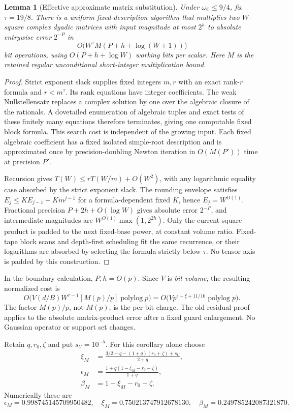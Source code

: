 \documentclass[11pt]{article}
\newtheorem{lemma}[theorem]{Lemma}
\newcommand{\plog}{\operatorname{polylog}}
\begin{document}
\begin{lemma}[Effective approximate matrix substitution]
Under $\omega_{\mathbb C}\leq9/4$, fix $\tau=19/8$. There is a uniform fixed-description algorithm that multiplies two $W$-square complex dyadic matrices with input magnitude at most $2^h$ to absolute entrywise error $2^{-P}$ in
\[
 O\bigl(W^\tau M(P+h+\log(W+1))\bigr)
\]
bit operations, using $O(P+h+\log W)$ working bits per scalar. Here $M$ is the retained regular unconditional short-integer multiplication bound.
\end{lemma}
\begin{proof}
Strict exponent slack supplies fixed integers $m,r$ with an exact rank-$r$ formula and $r<m^\tau$. Its rank equations have integer coefficients. The weak Nullstellensatz replaces a complex solution by one over the algebraic closure of the rationals. A dovetailed enumeration of algebraic tuples and exact tests of these finitely many equations therefore terminates, giving one computable fixed block formula. This search cost is independent of the growing input. Each fixed algebraic coefficient has a fixed isolated simple-root description and is approximated once by precision-doubling Newton iteration in $O(M(P'))$ time at precision $P'$.

Recursion gives $T(W)\leq rT(W/m)+O(W^2)$, with any logarithmic equality case absorbed by the strict exponent slack. The rounding envelope satisfies $E_j\leq K E_{j-1}+K m^{j-1}$ for a formula-dependent fixed $K$, hence $E_j=W^{O(1)}$. Fractional precision $P+2h+O(\log W)$ gives absolute error $2^{-P}$, and intermediate magnitudes are $W^{O(1)}\max(1,2^{2h})$. Only the current square product is padded to the next fixed-base power, at constant volume ratio. Fixed-tape block scans and depth-first scheduling fit the same recurrence, or their logarithms are absorbed by selecting the formula strictly below $\tau$. No tensor axis is padded by this construction.
\end{proof}

In the boundary calculation, $P,h=O(p)$. Since $V$ is \emph{bit volume}, the resulting normalized cost is
\[
 O\bigl(V(d/B)W^{\tau-1}[M(p)/p]\plog p\bigr)
 =O\bigl(Vp^{\epsilon-\xi+11/16}\plog p\bigr).
\]
The factor $M(p)/p$, not $M(p)$, is the per-bit charge. The old residual proof applies to the absolute matrix-product error after a fixed guard enlargement. No Gaussian operator or support set changes.

Retain $q,r_0,\zeta$ and put $s_U=10^{-5}$. For this corollary alone choose
\begin{align*}
 \xi_M&=\frac{3/2+q-(1+q)(r_0+\zeta)+s_U}{2+q},\\
 \epsilon_M&=\frac{1+q(1-\xi_M-r_0-\zeta)}{1+q},\\
 \beta_M&=1-\xi_M-r_0-\zeta.
\end{align*}
Numerically these are
\[
 \epsilon_M=0.998745145709950482,\quad
 \xi_M=0.750213747912678130,\quad
 \beta_M=0.249785242087321870.
\]
\end{document}
